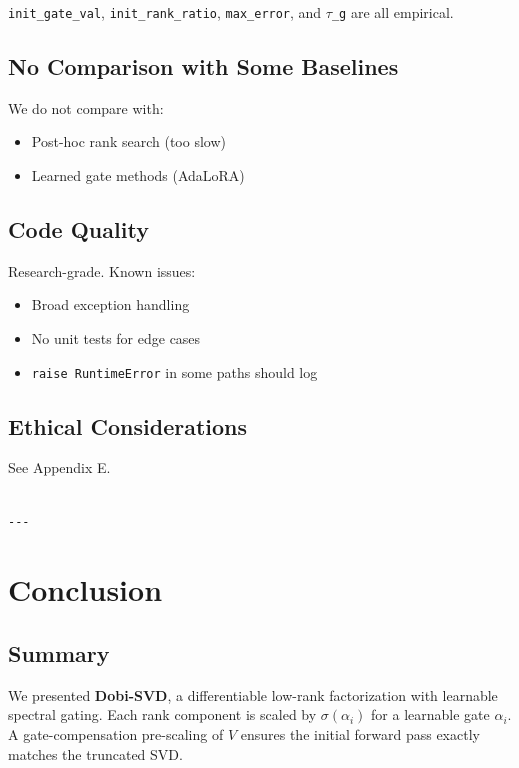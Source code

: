 \texttt{init\_gate\_val}, \texttt{init\_rank\_ratio}, \texttt{max\_error}, and \texttt{$\tau$\_g} are all empirical.

\subsection{No Comparison with Some Baselines}

We do not compare with:
\begin{itemize}
\item Post-hoc rank search (too slow)
\item Learned gate methods (AdaLoRA)

\end{itemize}
\subsection{Code Quality}

Research-grade. Known issues:
\begin{itemize}
\item Broad exception handling
\item No unit tests for edge cases
\item \texttt{raise RuntimeError} in some paths should log

\end{itemize}
\subsection{Ethical Considerations}

See Appendix E.
\begin{lstlisting}

---
\end{lstlisting}


\section{Conclusion}

\subsection{Summary}

We presented \textbf{Dobi-SVD}, a differentiable low-rank factorization with 
learnable spectral gating. Each rank component is scaled by $\sigma(\alpha_i)$ 
for a learnable gate $\alpha_i$. A gate-compensation pre-scaling of $V$ 
ensures the initial forward pass exactly matches the truncated SVD.

